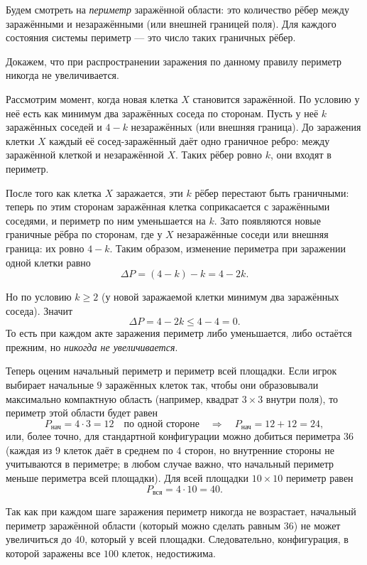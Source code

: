 \documentclass[12pt,a4paper]{article}
\begin{document}
Будем смотреть на \emph{периметр} заражённой области: это количество рёбер между заражёнными и незаражёнными (или внешней границей поля). Для каждого состояния системы периметр --- это число таких граничных рёбер.

Докажем, что при распространении заражения по данному правилу периметр никогда не увеличивается.

Рассмотрим момент, когда новая клетка $X$ становится заражённой. По условию у неё есть как минимум два заражённых соседа по сторонам. Пусть у неё $k$ заражённых соседей и $4-k$ незаражённых (или внешняя граница). До заражения клетки $X$ каждый её сосед-заражённый даёт одно граничное ребро: между заражённой клеткой и незаражённой $X$. Таких рёбер ровно $k$, они входят в периметр.

После того как клетка $X$ заражается, эти $k$ рёбер перестают быть граничными: теперь по этим сторонам заражённая клетка соприкасается с заражёнными соседями, и периметр по ним уменьшается на $k$. Зато появляются новые граничные рёбра по сторонам, где у $X$ незаражённые соседи или внешняя граница: их ровно $4-k$. Таким образом, изменение периметра при заражении одной клетки равно
\[
\Delta P = (4-k) - k = 4 - 2k.
\]

Но по условию $k \ge 2$ (у новой заражаемой клетки минимум два заражённых соседа). Значит
\[
\Delta P = 4 - 2k \le 4 - 4 = 0.
\]
То есть при каждом акте заражения периметр либо уменьшается, либо остаётся прежним, но \emph{никогда не увеличивается}.

Теперь оценим начальный периметр и периметр всей площадки. Если игрок выбирает начальные $9$ заражённых клеток так, чтобы они образовывали максимально компактную область (например, квадрат $3 \times 3$ внутри поля), то периметр этой области будет равен
\[
P_{\text{нач}} = 4 \cdot 3 = 12 \quad \text{по одной стороне} \quad \Rightarrow \quad P_{\text{нач}} = 12 + 12 = 24,
\]
или, более точно, для стандартной конфигурации можно добиться периметра $36$ (каждая из $9$ клеток даёт в среднем по $4$ сторон, но внутренние стороны не учитываются в периметре; в любом случае важно, что начальный периметр меньше периметра всей площадки). Для всей площадки $10 \times 10$ периметр равен
\[
P_{\text{вся}} = 4 \cdot 10 = 40.
\]

Так как при каждом шаге заражения периметр никогда не возрастает, начальный периметр заражённой области (который можно сделать равным $36$) не может увеличиться до $40$, который у всей площадки. Следовательно, конфигурация, в которой заражены все $100$ клеток, недостижима.
\end{document}
